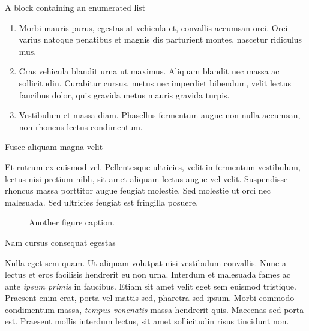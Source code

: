 \documentclass[final]{beamer}
\newlength{\colwidth}
\begin{document}
\begin{frame}[t]
\begin{columns}[t]
\begin{column}{\colwidth}
\begin{block}{A block containing an enumerated list}
\begin{enumerate}
      \item \alert{Morbi mauris purus}, egestas at vehicula et, convallis accumsan orci. Orci varius natoque penatibus et magnis dis parturient montes, nascetur ridiculus mus.

      \item \alert{Cras vehicula blandit urna ut maximus}. Aliquam blandit nec massa ac sollicitudin. Curabitur cursus, metus nec imperdiet bibendum, velit lectus faucibus dolor, quis gravida metus mauris gravida turpis.

      \item \alert{Vestibulum et massa diam}. Phasellus fermentum augue non nulla accumsan, non rhoncus lectus condimentum.

    \end{enumerate}

  \end{block}

  \begin{block}{Fusce aliquam magna velit}

    Et rutrum ex euismod vel. Pellentesque ultricies, velit in fermentum vestibulum, lectus nisi pretium nibh, sit amet aliquam lectus augue vel velit. Suspendisse rhoncus massa porttitor augue feugiat molestie. Sed molestie ut orci nec malesuada. Sed ultricies feugiat est fringilla posuere.

    \begin{figure}
      \centering
      \caption{Another figure caption.}
    \end{figure}

  \end{block}

  \begin{block}{Nam cursus consequat egestas}

    Nulla eget sem quam. Ut aliquam volutpat nisi vestibulum convallis. Nunc a lectus et eros facilisis hendrerit eu non urna. Interdum et malesuada fames ac ante \textit{ipsum primis} in faucibus. Etiam sit amet velit eget sem euismod tristique. Praesent enim erat, porta vel mattis sed, pharetra sed ipsum. Morbi commodo condimentum massa, \textit{tempus venenatis} massa hendrerit quis. Maecenas sed porta est. Praesent mollis interdum lectus, sit amet sollicitudin risus tincidunt non.


\end{block}
\end{column}
\end{columns}
\end{frame}
\end{document}
